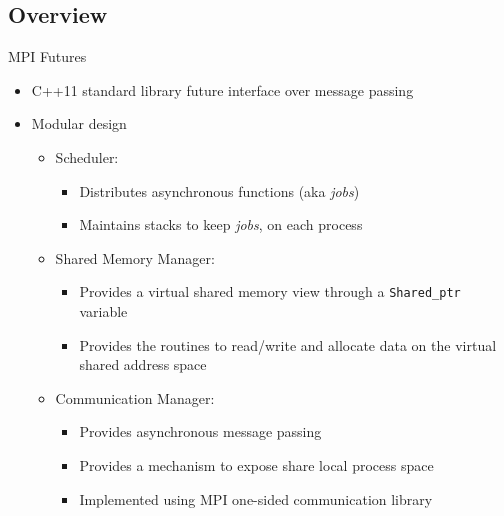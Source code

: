 \documentclass[svgnames]{beamer}
\begin{document}
\subsection{Overview}
\begin{frame}{MPI Futures}
\begin{itemize}
	\item C++11 standard library future interface over message passing
	\item Modular design
	\begin{itemize}
		\item Scheduler:
			\begin{itemize}
				\item Distributes asynchronous functions (aka \emph{jobs})
				\item Maintains stacks to keep \emph{jobs}, on each process
			\end{itemize}
		\item Shared Memory Manager:
			\begin{itemize}
				\item Provides a virtual shared memory view  through a \texttt{Shared\_ptr} variable
				\item Provides the routines to read/write and allocate data on the virtual shared address space 
			\end{itemize}
		\item Communication Manager:
			\begin{itemize}
				\item Provides asynchronous message passing
				\item Provides a mechanism to expose share local process space
				\item Implemented using MPI one-sided communication library
			\end{itemize}
	\end{itemize}
\end{itemize}	 
\end{frame}
\end{document}
